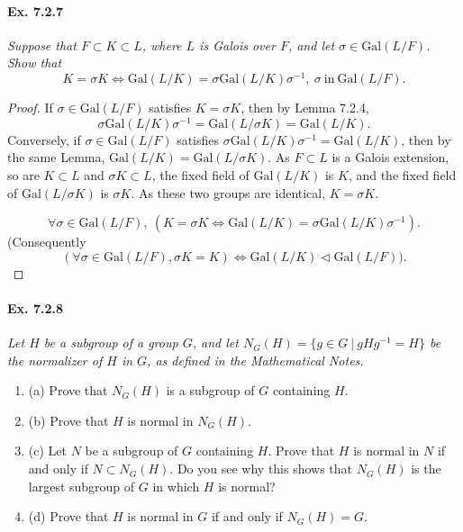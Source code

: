 \documentclass[11pt,a4paper]{article}
\newcommand{\be} {\begin{enumerate}}
\newcommand{\ee} {\end{enumerate}}
\newcommand{\Gal}{\mathrm{Gal}}
\begin{document}
\paragraph{Ex. 7.2.7}

{\it Suppose that $F \subset K \subset L$, where $L$ is Galois over $F$, and let $\sigma \in \Gal(L/F)$. Show that
$$K = \sigma K \iff \Gal(L/K) = \sigma \Gal(L/K) \sigma^{-1},\ \sigma\ \mathrm{ in }\  \Gal(L/F).$$
}

\begin{proof}
If $\sigma \in \Gal(L/F)$ satisfies $K = \sigma K$, then by Lemma 7.2.4,
$$\sigma \Gal(L/K)\sigma^{-1} = \Gal(L/\sigma K) = \Gal(L/K).$$
Conversely, if $\sigma \in \Gal(L/F)$ satisfies $\sigma \Gal(L/K)\sigma^{-1} = \Gal(L/K)$, then by the same Lemma, $\Gal(L/K) = \Gal(L/\sigma K)$.
As $F\subset L$ is a Galois extension, so are $K \subset L$ and $\sigma K \subset L$, the fixed field of  $\Gal(L/K)$ is $K$, and the fixed field of $\Gal(L/\sigma K)$ is $\sigma K$. As these two groups are identical, $K = \sigma K$.

$$\forall \sigma \in \Gal(L/F),\ (K = \sigma K \iff \Gal(L/K) = \sigma \Gal(L/K) \sigma^{-1}).$$
(Consequently
$$(\forall \sigma \in \Gal(L/F), \sigma K = K) \iff \Gal(L/K) \lhd \Gal(L/F)).$$
\end{proof}

\paragraph{Ex. 7.2.8}

{\it Let $H$ be a subgroup of a group $G$, and let $N_G(H) = \{g\in G \ | \ gHg^{-1} = H\}$ be the normalizer of $H$ in $G$, as defined in the Mathematical Notes.
\be
\item[(a)] Prove that $N_G(H)$ is a subgroup of $G$ containing $H$.
\item[(b)] Prove that $H$ is normal in $N_G(H)$.
\item[(c)] Let $N$ be a subgroup of $G$ containing $H$. Prove that $H$ is normal in $N$ if and only if $N \subset N_G(H)$. Do you see why this shows that $N_G(H)$ is the largest subgroup of $G$ in which $H$ is normal?
\item[(d)] Prove that $H$ is normal in $G$ if and only if $N_G(H) = G$.
\ee
}
\end{document}
